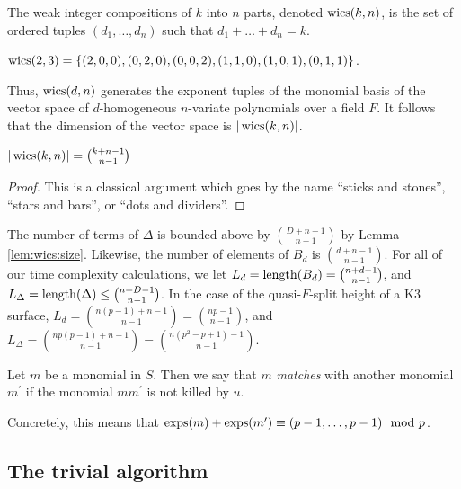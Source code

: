 \begin{defn}
    The weak integer compositions of $k$ into $n$ parts, 
    denoted $\operatorname{wics}(k, n)$, is the set of ordered tuples 
	\((d_{1}, \ldots, d_{n})\) such that 
    \(d_{1} + \ldots + d_{n} = k\).
\end{defn}

\begin{ex}
    $\operatorname{wics}(2, 3) = \lbrace (2, 0, 0), (0, 2, 0), (0, 0, 2), (1, 1, 0), (1, 0, 1), (0, 1, 1) \rbrace$.
\end{ex}

Thus, $\operatorname{wics}(d, n)$ generates the exponent tuples of the 
monomial basis of the vector space of $d$-homogeneous 
$n$-variate polynomials over a field $F$.
It follows that the dimension of the vector space is $|\operatorname{wics}(k, n)|$.

\begin{lem}
    \label{lem:wics:size}
    $|\operatorname{wics}(k, n)| = \binom{k + n - 1}{n - 1}$
\end{lem}

\begin{proof}
	This is a classical argument which goes by the 
    name ``sticks and stones'', ``stars and bars'', or 
    ``dots and dividers''.
\end{proof}


\begin{rmk}
    The number of terms of \(\Delta\) is bounded 
    above by \(\binom{D+n-1}{n-1}\) by Lemma \ref{lem:wics:size}.
    Likewise, the number of elements of 
    \(B_{d}\) is \(\binom{d+n-1}{n-1}\).
    For all of our time complexity calculations, 
    we let $L_{d} = \operatorname{length}(B_{d}) = \binom{n + d - 1}{n - 1}$, 
    and $L_{\Delta} = \operatorname{length}(\Delta) \leq \binom{n + D - 1}{n - 1}$.
    In the case of the quasi-\(F\)-split height of a K3 surface, 
    $L_{d} = \binom{n(p - 1) + n - 1}{n - 1} = \binom{np - 1}{n - 1}$, 
    and $L_{\Delta} = \binom{np(p - 1) + n - 1}{n - 1} = \binom{n(p^2 - p + 1) - 1}{n - 1}$.
\end{rmk}

\begin{defn}
	Let \(m\) be a monomial in \(S\). 
	Then we say that \(m\) \textit{matches}
	with another monomial \(m^{\prime}\) 
	if the monomial \(mm^{\prime}\) is
	not killed by \(u\).
\end{defn}

Concretely, this means that $\operatorname{exps}(m) + \operatorname{exps}(m^{\prime}) \equiv (p - 1, \dots, p - 1) \mod p$.

\subsection{The trivial algorithm}

